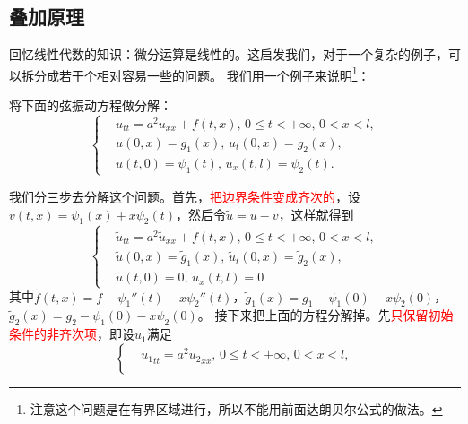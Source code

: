 \subsection{叠加原理}
回忆线性代数的知识：微分运算是线性的。这启发我们，对于一个复杂的例子，可以拆分成若干个相对容易一些的问题。
我们用一个例子来说明\footnote{注意这个问题是在有界区域进行，所以不能用前面达朗贝尔公式的做法。}：
\begin{problembox}
    \begin{example}
        将下面的弦振动方程做分解：
        \begin{equation*}
            \left\{
                \begin{aligned}
                    &u_{tt} = a^2 u_{xx} + f(t, x),\, 0 \leq t < +\infty,\, 0< x < l,\\
                    &u(0, x) = g_1(x),\, u_t(0, x) = g_2(x),\\
                    &u(t, 0) = \psi_1(t),\, u_x(t, l) = \psi_2(t).
                \end{aligned}
            \right.
        \end{equation*}
    \end{example}
    \begin{solution}
        我们分三步去分解这个问题。首先，\textcolor{red}{把边界条件变成齐次的}，设$v(t, x) = \psi_1(x) + x\psi_2(t)$，然后令$\tilde{u} = u - v$，这样就得到
        \begin{equation*}
            \left\{
                \begin{aligned}
                    &\tilde{u}_{tt} = a^2 \tilde{u}_{xx} + {\tilde{f}}(t, x),\, 0 \leq t < +\infty,\, 0 < x < l,\\
                    &\tilde{u}(0, x) = {\tilde{g}_1}(x),\, \tilde{u}_t(0, x) = {\tilde{g}_2}(x),\\
                    &\tilde{u}(t, 0) = 0,\, \tilde{u}_x(t, l) = 0
                \end{aligned}
            \right.
        \end{equation*}
        其中${\tilde{f}}(t, x) = f - {\psi_1}''(t) - x{\psi_2}''(t)$，${\tilde{g}_1}(x) = g_1 - \psi_1(0) - x \psi_2(0)$，${\tilde{g}_2}(x) = g_2 - \psi_1(0) - x \psi_2(0)$。
        接下来把上面的方程分解掉。先\textcolor{red}{只保留初始条件的非齐次项}，即设$u_1$满足
        \begin{equation*}
            \left\{
                \begin{aligned}
                    &{u_1}_{tt} = a^2 {u_2}_{xx},\, 0 \leq t < +\infty,\, 0 < x < l,\\

\end{aligned}
\end{equation*}
\end{solution}
\end{problembox}
